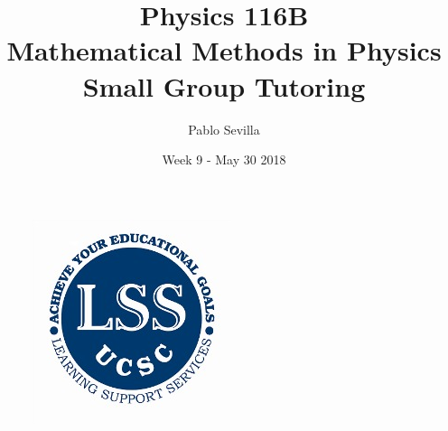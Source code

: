 \documentclass{article}
\title{Physics 116B \\ Mathematical Methods in Physics\\ Small Group Tutoring}
\author{Pablo Sevilla}
\date{Week 9 - May 30 2018}
\begin{document}
\maketitle

\begin{figure}[h]
\centering
\includegraphics[scale=0.3]{lss}
\end{figure}
\end{document}
